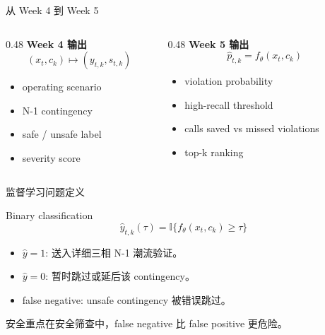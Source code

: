 \documentclass[aspectratio=169,11pt]{beamer}
\newcommand{\ind}{\mathbb{I}}
\begin{document}
\begin{frame}{从 Week 4 到 Week 5}
\begin{columns}
\begin{column}{0.48\textwidth}
\textbf{Week 4 输出}
\[(x_t,c_k) \mapsto (y_{t,k},s_{t,k})\]
\begin{itemize}\item operating scenario \item N-1 contingency \item safe / unsafe label \item severity score\end{itemize}
\end{column}
\begin{column}{0.48\textwidth}
\textbf{Week 5 输出}
\[\hat p_{t,k}=f_\theta(x_t,c_k)\]
\begin{itemize}\item violation probability \item high-recall threshold \item calls saved vs missed violations \item top-k ranking\end{itemize}
\end{column}
\end{columns}
\end{frame}

\begin{frame}{监督学习问题定义}
\begin{block}{Binary classification}\[\hat y_{t,k}(\tau)=\ind\{f_\theta(x_t,c_k)\ge \tau\}\]\end{block}
\begin{itemize}\item $\hat y=1$: 送入详细三相 N-1 潮流验证。\item $\hat y=0$: 暂时跳过或延后该 contingency。\item false negative: unsafe contingency 被错误跳过。\end{itemize}
\begin{alertblock}{安全重点}在安全筛查中，false negative 比 false positive 更危险。\end{alertblock}
\end{frame}
\end{document}
